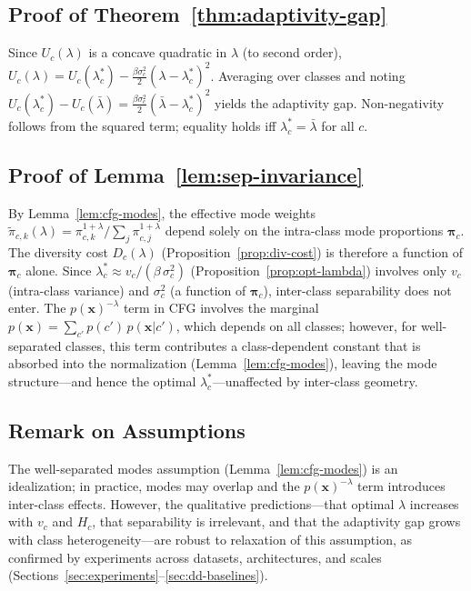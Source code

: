 \subsection{Proof of Theorem~\ref{thm:adaptivity-gap}}
Since $U_c(\lambda)$ is a concave quadratic in $\lambda$ (to second order), $U_c(\lambda) = U_c(\lambda_c^*) - \frac{\beta\sigma_c^2}{2}(\lambda - \lambda_c^*)^2$. Averaging over classes and noting $U_c(\lambda_c^*) - U_c(\bar\lambda) = \frac{\beta\sigma_c^2}{2}(\bar\lambda - \lambda_c^*)^2$ yields the adaptivity gap. Non-negativity follows from the squared term; equality holds iff $\lambda_c^* = \bar\lambda$ for all $c$.

\subsection{Proof of Lemma~\ref{lem:sep-invariance}}
By Lemma~\ref{lem:cfg-modes}, the effective mode weights $\tilde{\pi}_{c,k}(\lambda) = \pi_{c,k}^{1+\lambda}/\sum_j \pi_{c,j}^{1+\lambda}$ depend solely on the intra-class mode proportions $\boldsymbol{\pi}_c$. The diversity cost $D_c(\lambda)$ (Proposition~\ref{prop:div-cost}) is therefore a function of $\boldsymbol{\pi}_c$ alone. Since $\lambda_c^* \approx v_c / (\beta\,\sigma_c^2)$ (Proposition~\ref{prop:opt-lambda}) involves only $v_c$ (intra-class variance) and $\sigma_c^2$ (a function of $\boldsymbol{\pi}_c$), inter-class separability does not enter. The $p(\mathbf{x})^{-\lambda}$ term in CFG involves the marginal $p(\mathbf{x}) = \sum_{c'} p(c')\,p(\mathbf{x}|c')$, which depends on all classes; however, for well-separated classes, this term contributes a class-dependent constant that is absorbed into the normalization (Lemma~\ref{lem:cfg-modes}), leaving the mode structure---and hence the optimal $\lambda_c^*$---unaffected by inter-class geometry.

\subsection{Remark on Assumptions}
The well-separated modes assumption (Lemma~\ref{lem:cfg-modes}) is an idealization; in practice, modes may overlap and the $p(\mathbf{x})^{-\lambda}$ term introduces inter-class effects. However, the qualitative predictions---that optimal $\lambda$ increases with $v_c$ and $H_c$, that separability is irrelevant, and that the adaptivity gap grows with class heterogeneity---are robust to relaxation of this assumption, as confirmed by experiments across datasets, architectures, and scales (Sections~\ref{sec:experiments}--\ref{sec:dd-baselines}).

